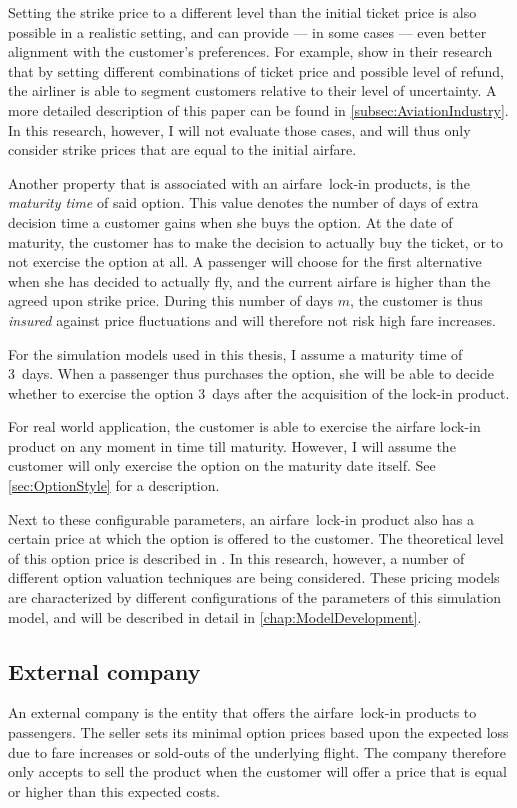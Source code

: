 Setting the strike price to a different level than the initial ticket price is also possible in a realistic setting, and can provide --- in some cases --- even better alignment with the customer's preferences. For example,  show in their research that by setting different combinations of ticket price and possible level of refund, the airliner is able to segment customers relative to their level of uncertainty. A more detailed description of this paper can be found in \autoref{subsec:AviationIndustry}. In this research, however, I will not evaluate those cases, and will thus only consider strike prices that are equal to the initial airfare.


Another property that is associated with an airfare~lock-in products, is the \emph{maturity time} of said option. This value denotes the number of days of extra decision time a customer gains when she buys the option. At the date of maturity, the customer has to make the decision to actually buy the ticket, or to not exercise the option at all. A passenger will choose for the first alternative when she has decided to actually fly, and the current airfare is higher than the agreed upon strike price. During this number of days $m$, the customer is thus \emph{insured} against price fluctuations and will therefore not risk high fare increases.

For the simulation models used in this thesis, I assume a maturity time of 3~days. When a passenger thus purchases the option, she will be able to decide whether to exercise the option 3~days after the acquisition of the lock-in product.

For real world application, the customer is able to exercise the airfare lock-in product on any moment in time till maturity. However, I will assume the customer will only exercise the option on the maturity date itself. See \autoref{sec:OptionStyle} for a description.

Next to these configurable parameters, an airfare~lock-in product also has a certain price at which the option is offered to the customer. The theoretical level of this option price is described in . In this research, however, a number of different option valuation techniques are being considered. These pricing models are characterized by different configurations of the parameters of this simulation model, and will be described in detail in \autoref{chap:ModelDevelopment}.


\subsection{External company}
An external company is the entity that offers the airfare~lock-in products to passengers. The seller sets its minimal option prices based upon the expected loss due to fare increases or sold-outs of the underlying flight. The company therefore only accepts to sell the product when the customer will offer a price that is equal or higher than this expected costs.

